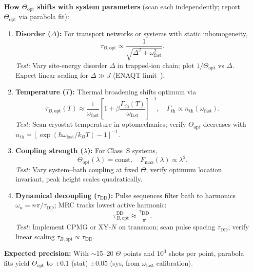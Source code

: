 \documentclass[11pt,letterpaper]{article}
\begin{document}
\begin{tcolorbox}[colback=green!5!white,colframe=green!60!black,title=Falsifiable Predictions: Scaling Laws]

\textbf{How $\Theta_{\mathrm{opt}}$ shifts with system parameters} (scan each independently; report $\Theta_{\mathrm{opt}}$ via parabola fit):

\begin{enumerate}[leftmargin=*,noitemsep,topsep=2pt]
\item \textbf{Disorder ($\Delta$):} For transport networks or systems with static inhomogeneity,
\[
\tau_{B,\text{opt}} \propto \frac{1}{\sqrt{\Delta^2 + \omega_{\mathrm{fast}}^2}}.
\]
\emph{Test:} Vary site-energy disorder $\Delta$ in trapped-ion chain; plot $1/\Theta_{\mathrm{opt}}$ vs $\Delta$. Expect linear scaling for $\Delta \gg J$ (ENAQT limit~\cite{Maier2019}).

\item \textbf{Temperature ($T$):} Thermal broadening shifts optimum via
\[
\tau_{B,\text{opt}}(T) \approx \frac{1}{\omega_{\mathrm{fast}}}\left[1 + \beta\frac{\Gamma_{\text{th}}(T)}{\omega_{\mathrm{fast}}}\right]^{-1}, \quad \Gamma_{\text{th}} \propto n_{\text{th}}(\omega_{\mathrm{fast}}).
\]
\emph{Test:} Scan cryostat temperature in optomechanics; verify $\Theta_{\mathrm{opt}}$ decreases with $n_{\text{th}}=[\exp(\hbar\omega_{\mathrm{fast}}/k_BT)-1]^{-1}$.

\item \textbf{Coupling strength ($\lambda$):} For Class~S systems,
\[
\Theta_{\mathrm{opt}}(\lambda) = \text{const}, \quad F_{\max}(\lambda) \propto \lambda^2.
\]
\emph{Test:} Vary system--bath coupling at fixed $\Theta$; verify optimum location invariant, peak height scales quadratically.

\item \textbf{Dynamical decoupling ($\tau_{\text{DD}}$):} Pulse sequences filter bath to harmonics $\omega_n=n\pi/\tau_{\text{DD}}$; MRC tracks lowest active harmonic:
\[
\tau_{B,\text{opt}}^{\text{DD}} \approx \frac{\tau_{\text{DD}}}{\pi}.
\]
\emph{Test:} Implement CPMG or XY-$N$ on transmon; scan pulse spacing $\tau_{\text{DD}}$; verify linear scaling $\tau_{B,\text{opt}} \propto \tau_{\text{DD}}$.
\end{enumerate}

\textbf{Expected precision:} With $\sim$15--20 $\Theta$ points and $10^3$ shots per point, parabola fits yield $\Theta_{\mathrm{opt}}$ to $\pm0.1$ (stat) $\pm0.05$ (sys, from $\omega_{\mathrm{fast}}$ calibration).

\end{tcolorbox}
\end{document}
